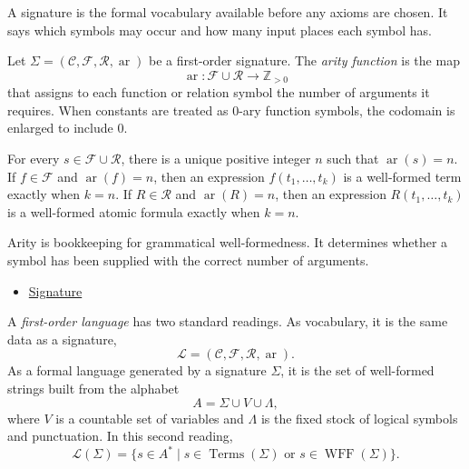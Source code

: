 \begin{remark*}[Interpretation]
A signature is the formal vocabulary available before any axioms are chosen.
It says which symbols may occur and how many input places each symbol has.
\end{remark*}

\NoLocalDependencies

\begin{definition}[Arity]
\label{def:arity}
Let $\Sigma=(\mathcal{C},\mathcal{F},\mathcal{R},\operatorname{ar})$ be a
first-order signature. The \emph{arity function} is the map
\[
  \operatorname{ar}:\mathcal{F}\cup\mathcal{R}\to\mathbb{Z}_{>0}
\]
that assigns to each function or relation symbol the number of arguments it
requires. When constants are treated as $0$-ary function symbols, the codomain
is enlarged to include $0$.
\end{definition}

\begin{remark*}
For every $s\in\mathcal{F}\cup\mathcal{R}$, there is a unique positive
integer $n$ such that $\operatorname{ar}(s)=n$. If $f\in\mathcal{F}$ and
$\operatorname{ar}(f)=n$, then an expression $f(t_1,\ldots,t_k)$ is a
well-formed term exactly when $k=n$. If $R\in\mathcal{R}$ and
$\operatorname{ar}(R)=n$, then an expression $R(t_1,\ldots,t_k)$ is a
well-formed atomic formula exactly when $k=n$.
\end{remark*}

\begin{remark*}[Interpretation]
Arity is bookkeeping for grammatical well-formedness. It determines whether a
symbol has been supplied with the correct number of arguments.
\end{remark*}

\begin{dependencies}
\begin{itemize}
  \item \hyperref[def:signature]{Signature}
\end{itemize}
\end{dependencies}

\begin{definition}[Language]
\label{def:language}
A \emph{first-order language} has two standard readings. As vocabulary, it is
the same data as a signature,
\[
  \mathcal{L}=(\mathcal{C},\mathcal{F},\mathcal{R},\operatorname{ar}).
\]
As a formal language generated by a signature $\Sigma$, it is the set of
well-formed strings built from the alphabet
\[
  A=\Sigma\cup V\cup\Lambda,
\]
where $V$ is a countable set of variables and $\Lambda$ is the fixed stock of
logical symbols and punctuation. In this second reading,
\[
  \mathcal{L}(\Sigma)
  =\{s\in A^* \mid s\in\operatorname{Terms}(\Sigma)
    \text{ or } s\in\operatorname{WFF}(\Sigma)\}.
\]
\end{definition}

